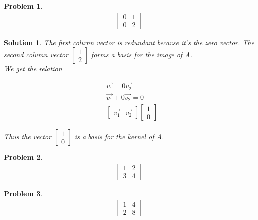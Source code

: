 \documentclass{article}
\newtheorem{problem}{Problem}
\newtheorem*{solution}{Solution}
\begin{document}
\begin{problem}
\begin{align*}
\begin{bmatrix}
0 & 1 \\ 0 & 2
\end{bmatrix}
\end{align*}
\end{problem}

\begin{solution}
The first column vector is redundant because it's the zero vector. The second column vector $\begin{bmatrix} 1 \\ 2 \end{bmatrix}$ forms a basis for the image of A. \\

We get the relation

\begin{align*}
& \vec{v_{1}} = 0\vec{v_{2}} \\
& \vec{v_{1}} + 0\vec{v_{2}} = 0 \\
& \begin{bmatrix} \vec{v_{1}} & \vec{v_{2}} \end{bmatrix} \begin{bmatrix}1 \\ 0 \end{bmatrix} 
\end{align*}

Thus the vector $\begin{bmatrix}1 \\ 0 \end{bmatrix}$ is a basis for the kernel of A.

\end{solution}


\begin{problem}
\begin{align*}
\begin{bmatrix}
1 & 2 \\ 3 & 4
\end{bmatrix}
\end{align*}
\end{problem}

\begin{problem}
\begin{align*}
\begin{bmatrix}
1 & 4 \\ 2 & 8
\end{bmatrix}
\end{align*}
\end{problem}
\end{document}
